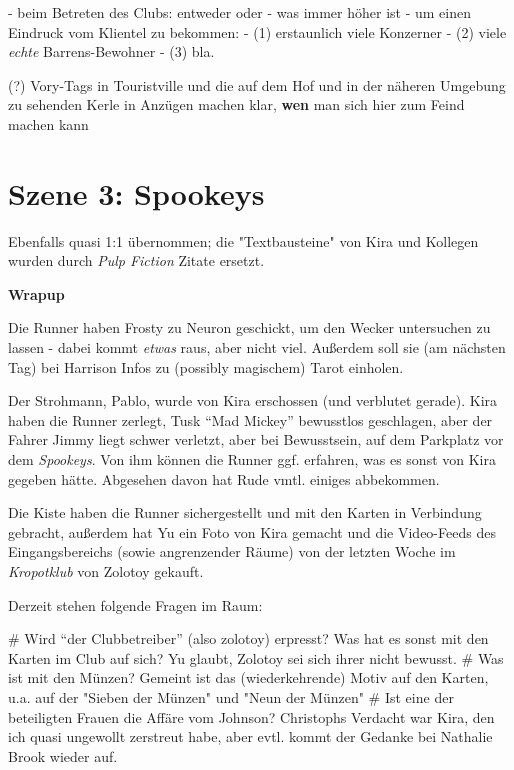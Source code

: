 - beim Betreten des Clubs: entweder  oder  - was immer höher ist - um einen Eindruck vom Klientel zu bekommen: 
- (1) erstaunlich viele Konzerner
- (2) viele \textit{echte} Barrens-Bewohner
- (3) bla.

 (?) Vory-Tags in Touristville und die auf dem Hof und in der näheren Umgebung zu sehenden Kerle in Anzügen machen klar, \textbf{wen} man sich hier zum Feind machen kann


\section{Szene 3: Spookeys}

Ebenfalls quasi 1:1 übernommen; die "Textbausteine" von Kira und Kollegen wurden durch \textit{Pulp Fiction} Zitate ersetzt.

\vspace{1em}
\textbf{Wrapup}
\vspace{0.5em}

Die Runner haben Frosty zu Neuron geschickt, um den Wecker untersuchen zu lassen - dabei kommt \textit{etwas} raus, aber nicht viel. Außerdem soll sie (am nächsten Tag) bei Harrison Infos zu (possibly magischem) Tarot einholen.

Der Strohmann, Pablo, wurde von Kira erschossen (und verblutet gerade). Kira haben die Runner zerlegt, Tusk ``Mad Mickey'' bewusstlos geschlagen, aber der Fahrer Jimmy liegt schwer verletzt, aber bei Bewusstsein, auf dem Parkplatz vor dem \textit{Spookeys}. Von ihm können die Runner ggf. erfahren, was es sonst von Kira gegeben hätte. Abgesehen davon hat Rude vmtl. einiges abbekommen.

Die Kiste haben die Runner sichergestellt und mit den Karten in Verbindung gebracht, außerdem hat Yu ein Foto von Kira gemacht und die Video-Feeds des Eingangsbereichs (sowie angrenzender Räume) von der letzten Woche im \textit{Kropotklub} von Zolotoy gekauft.

Derzeit stehen folgende Fragen im Raum:

\begin{easylist}
    # Wird ``der Clubbetreiber'' (also zolotoy) erpresst? Was hat es sonst mit den Karten im Club auf sich? Yu glaubt, Zolotoy sei sich ihrer nicht bewusst.
    # Was ist mit den Münzen? Gemeint ist das (wiederkehrende) Motiv auf den Karten, u.a. auf der "Sieben der Münzen" und "Neun der Münzen"
    # Ist eine der beteiligten Frauen die Affäre vom Johnson? Christophs Verdacht war Kira, den ich quasi ungewollt zerstreut habe, aber evtl. kommt der Gedanke bei Nathalie Brook wieder auf.
\end{easylist}

